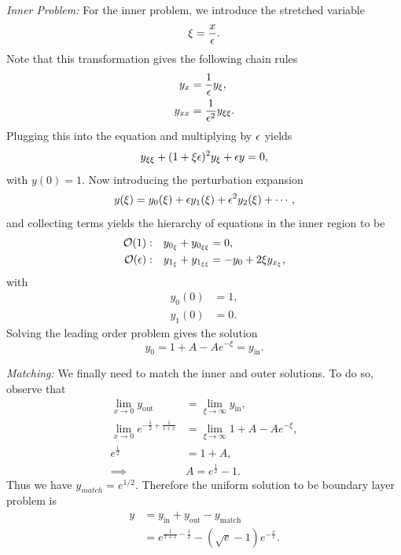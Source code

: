 \documentclass[12pt]{report}
\begin{document}
\begin{solution}
\begin{enumerate}
        \noindent
        {\it Inner Problem: }
        For the inner problem, we introduce the stretched variable
        \[ 
            \xi = \frac{x}{{\epsilon}}.
        \]
        Note that this transformation gives the following chain rules
        \begin{align*}
            y_x &= \frac{1}{{\epsilon}} y_\xi,\\
            y_{xx} &= \frac{1}{{\epsilon}^2} y_{\xi\xi}.
        \end{align*}
        Plugging this into the equation and multiplying by ${\epsilon}$ yields
        \[ 
            y_{\xi\xi} + (1+\xi{\epsilon})^2y_\xi + {\epsilon} y = 0,
        \]
        with $y(0) = 1.$ Now introducing the perturbation expansion
        \[ 
            y(\xi) = y_0(\xi) + {\epsilon} y_1(\xi) + {\epsilon}^2 y_2(\xi)+\cdots,
        \]
        and collecting terms yields the hierarchy of equations in the inner region to be
        \begin{align*}
            {\mathcal{O}}(1):& ~~~ y_{0_\xi} + y_{0_{\xi\xi}} = 0,\\
            {\mathcal{O}}({\epsilon}):& ~~~ y_{1_\xi} + y_{1_{\xi\xi}} = -y_0 + 2\xi y_{x_\xi},
        \end{align*}
        with
        \begin{align*}
            y_0(0) &= 1,\\
            y_1(0) &= 0.
        \end{align*}
        Solving the leading order problem gives the solution
        \[
            y_0 = 1 + A - Ae^{-\xi} = y_{\text{in}}.
        \]
        
        \noindent
        {\it Matching: } We finally need to match the inner and outer solutions. To do so, observe that
        \begin{align*}
            \lim_{x \to 0} y_{\text{out}} &= \lim_{\xi \to \infty} y_{\text{in}},\\
            \lim_{x \to 0} e^{-\frac{1}{2} + \frac{1}{1+x}} &= \lim_{\xi \to \infty} 1 + A - Ae^{-\xi}, \\
            e^{\frac{1}{2}}&=1 + A,\\
            \implies &A = e^{\frac{1}{2}} - 1. 
        \end{align*}
        Thus we have $y_{match} = e^{1/2}.$ Therefore the uniform solution to be boundary layer problem is 
        \begin{align*}
            y &= y_{\text{in}} + y_{\text{out}} - y_{\text{match}}\\
            &= e^{\frac{1}{x+1}-\frac{1}{2}}-\left(\sqrt{e}-1\right) e^{-\frac{x}{\epsilon }}.
        \end{align*}



\end{enumerate}
\end{solution}
\end{document}
